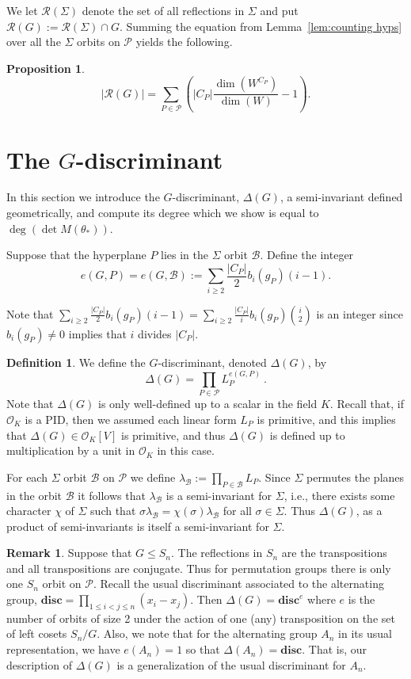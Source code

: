 \documentclass[12pt]{amsart}
\providecommand{\binom}[2]{{#1\choose#2}}
\renewcommand{\geq}{\geqslant}
\renewcommand{\leq}{\leqslant}
\newcommand{\Sn}{{S_n}}
\newcommand{\OK}{{{\mathcal O}_K}}
\newtheorem{prop}[thm]{Proposition}
\theoremstyle{definition}
\newtheorem{defn}[thm]{Definition}
\newtheorem{remark}[thm]{Remark}
\newcommand{\disc}{{\mathbf{disc}}}
\newcommand{\calb}{\mathcal{B}}
\newcommand{\calp}{\mathcal{P}}
\newcommand{\calr}{\mathcal{R}}
\newcommand{\bth}{{{\theta_*}}} %
\begin{document}
We let $\calr(\Sigma)$ denote the set of all reflections in $\Sigma$ and put $\calr(G) := \calr(\Sigma) \cap G$.
Summing the equation from Lemma~\ref{lem:counting hyps} over all the $\Sigma$ orbits on $\calp$  yields the following.

\begin{prop}\label{prop: counting reflections}
$$
    |\calr(G)| = \sum_{P\in\calp}\left(|C_P|\frac{\dim (W^{C_P})}{\dim(W)} -1\right).
 $$
\end{prop}

\section{The $G$-discriminant}\label{discriminant}
In this section we introduce the $G$-discriminant, $\Delta(G)$, 
a semi-invariant defined geometrically, and compute its degree 
which we show is equal to $\deg( \det M(\bth))$.


 Suppose that the hyperplane $P$ lies in the $\Sigma$ orbit $\calb$.
Define the integer
  $$
        e(G,P) = e(G,\calb) := \sum_{i\geq 2}\frac{ |C_P|}{2} b_i(g_P) (i-1).
    $$
    
    Note that $\sum_{i\geq 2}\frac{ |C_P|}{2} b_i(g_P) (i-1) = \sum_{i\geq 2}\frac{ |C_P|}{i} b_i(g_P) \binom{i}{2}$
    is an integer since $b_i(g_P) \ne 0$ implies that $i$ divides $|C_P|$.

\begin{defn}
 We define the $G$-discriminant, denoted $\Delta(G)$, by
 $$\Delta(G) = \prod_{P \in \calp} L_P^{e(G,P)}\ .$$ 
 Note that $\Delta(G)$ is only well-defined up to a scalar in the field $K$.
Recall that, if $\OK$ is a PID, then we 
assumed each linear form $L_P$ is primitive, and this implies that
$\Delta(G)\in \OK[V]$ is primitive, 
and thus $\Delta(G) $ is defined up to multiplication by a unit in $\OK$
in this case.
 \end{defn}
For each $\Sigma$ orbit $\calb$ on $\calp$ we define 
$\lambda_\calb := \prod_{P\in\calb}L_P$.
  Since $\Sigma$ permutes the planes in the orbit $\calb$ it follows that
$\lambda_{\calb}$ is a semi-invariant for $\Sigma$, i.e., there exists
some character $\chi$ of $\Sigma$ such that 
$\sigma \lambda_\calb = \chi(\sigma) \lambda_\calb$ for all $\sigma \in \Sigma$.  
Thus $\Delta(G)$, as a product of semi-invariants is itself a 
 semi-invariant for $\Sigma$.

\begin{remark}\label{G-discriminant for permutations}
  Suppose that $G \leq \Sn$.  The reflections in $\Sn$ are the transpositions
  and all transpositions are conjugate.  Thus for permutation groups 
  there is only one $\Sn$ orbit on $\calp$.  Recall the usual discriminant associated to the alternating group, $\disc=\prod_{1 \leq i < j \leq n}(x_i-x_j)$.  Then
  $\Delta(G) = \disc^e$ where
  $e$ is the number of orbits of size 2 under the action of one (any) 
  transposition on the set of left cosets $\Sn/G$.  Also, we note that for the alternating group $A_n$ in its usual representation, we have $e(A_n)=1$ so that $\Delta(A_n)=\disc$.  That is, our description of $\Delta(G)$ is a generalization of the usual discriminant for $A_n$.
\end{remark}
\end{document}
